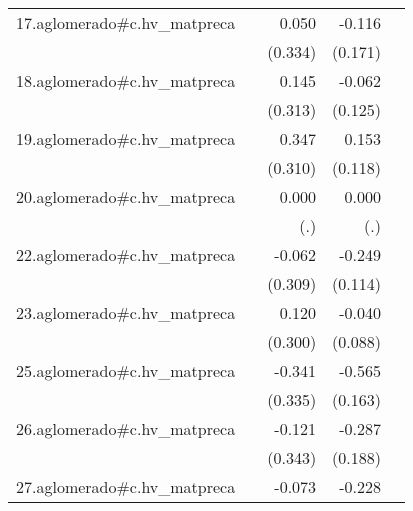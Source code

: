 {\begin{longtable}{l*{4}{D{.}{.}{-1}}}
\addlinespace
17.aglomerado#c.hv\_matpreca&                     &       0.050         &      -0.116         &                     \\
            &                     &     (0.334)         &     (0.171)         &                     \\
\addlinespace
18.aglomerado#c.hv\_matpreca&                     &       0.145         &      -0.062         &                     \\
            &                     &     (0.313)         &     (0.125)         &                     \\
\addlinespace
19.aglomerado#c.hv\_matpreca&                     &       0.347         &       0.153         &                     \\
            &                     &     (0.310)         &     (0.118)         &                     \\
\addlinespace
20.aglomerado#c.hv\_matpreca&                     &       0.000         &       0.000         &                     \\
            &                     &         (.)         &         (.)         &                     \\
\addlinespace
22.aglomerado#c.hv\_matpreca&                     &      -0.062         &      -0.249\sym{*}  &                     \\
            &                     &     (0.309)         &     (0.114)         &                     \\
\addlinespace
23.aglomerado#c.hv\_matpreca&                     &       0.120         &      -0.040         &                     \\
            &                     &     (0.300)         &     (0.088)         &                     \\
\addlinespace
25.aglomerado#c.hv\_matpreca&                     &      -0.341         &      -0.565\sym{***}&                     \\
            &                     &     (0.335)         &     (0.163)         &                     \\
\addlinespace
26.aglomerado#c.hv\_matpreca&                     &      -0.121         &      -0.287         &                     \\
            &                     &     (0.343)         &     (0.188)         &                     \\
\addlinespace
27.aglomerado#c.hv\_matpreca&                     &      -0.073         &      -0.228\sym{***}&                     \\

\end{longtable}}
